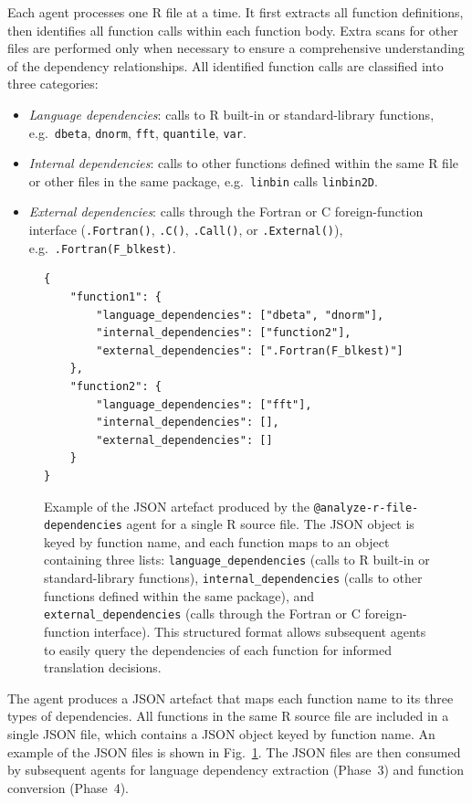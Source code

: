 \documentclass[12pt,a4paper]{article}
\makeatletter
\newcommand{\agent}[1]{\texttt{@#1}}
\makeatother
\begin{document}
Each agent processes one R file at a time. It first extracts all function definitions, then identifies all function calls within each function body. Extra scans for other files are performed only when necessary to ensure a comprehensive understanding of the dependency relationships. All identified function calls are classified into three categories:
\begin{itemize}
    \item \textit{Language dependencies}: calls to R built-in or standard-library functions, e.g.\ \texttt{dbeta}, \texttt{dnorm}, \texttt{fft}, \texttt{quantile}, \texttt{var}.
    \item \textit{Internal dependencies}: calls to other functions defined within the same R file or other files in the same package, e.g.\ \texttt{linbin} calls \texttt{linbin2D}.
    \item \textit{External dependencies}: calls through the Fortran or C foreign-function interface (\texttt{.Fortran()}, \texttt{.C()}, \texttt{.Call()}, or \texttt{.External()}), e.g.\ \texttt{.Fortran(F\_blkest)}.
\end{itemize}

\begin{figure}
\begin{verbatim}
{
    "function1": {
        "language_dependencies": ["dbeta", "dnorm"],
        "internal_dependencies": ["function2"],
        "external_dependencies": [".Fortran(F_blkest)"]
    },
    "function2": {
        "language_dependencies": ["fft"],
        "internal_dependencies": [],
        "external_dependencies": []
    }
}
\end{verbatim}
\caption{Example of the JSON artefact produced by the \agent{analyze-r-file-dependencies} agent for a single R source file. The JSON object is keyed by function name, and each function maps to an object containing three lists: \texttt{language\_dependencies} (calls to R built-in or standard-library functions), \texttt{internal\_dependencies} (calls to other functions defined within the same package), and \texttt{external\_dependencies} (calls through the Fortran or C foreign-function interface). This structured format allows subsequent agents to easily query the dependencies of each function for informed translation decisions.}\label{fig:json_example}
\end{figure}

The agent produces a JSON artefact that maps each function name to its three types of dependencies. All functions in the same R source file are included in a single JSON file, which contains a JSON object keyed by function name. An example of the JSON files is shown in Fig.~\ref{fig:json_example}. The JSON files are then consumed by subsequent agents for language dependency extraction (Phase~3) and function conversion (Phase~4).
\end{document}
